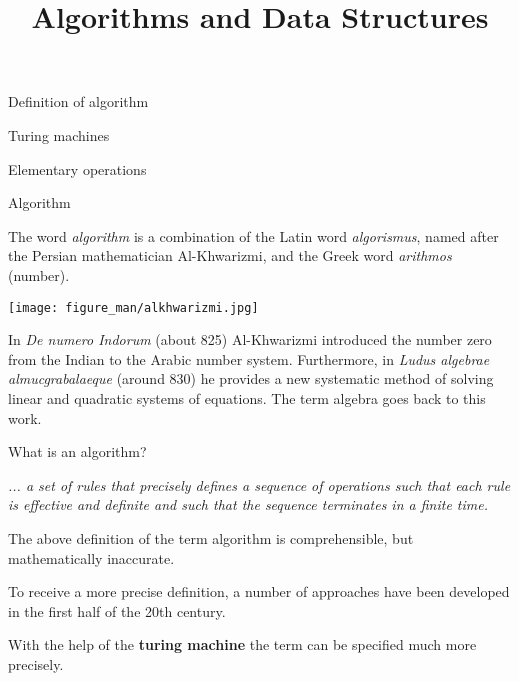 \documentclass[11pt,compress,t,notes=noshow, xcolor=table]{beamer}
\title{Algorithms and Data Structures}
\begin{document}
{
  \item Definition of algorithm
  \item Turing machines
  \item Elementary operations
}


\begin{vbframe}{Algorithm}

The word \emph{algorithm} is a combination of the Latin word \emph{algorismus}, named after the Persian mathematician Al-Khwarizmi, and the Greek word \emph{arithmos} (number).

\lz

\begin{minipage}{0.4\textwidth}
  \begin{center}
\texttt{[image: figure\_man/alkhwarizmi.jpg]}
  \end{center}
\end{minipage}
\begin{minipage}{0.5\textwidth}
  \begin{footnotesize}
  In \emph{De numero Indorum} (about 825) Al-Khwarizmi introduced the number zero from the Indian to the Arabic number system. Furthermore, in \emph{Ludus algebrae almucgrabalaeque} (around 830) he provides a new systematic method of solving linear and quadratic systems of equations. The term algebra goes back to this work.
  \end{footnotesize}
\end{minipage}



\framebreak

What is an algorithm?

\lz

\emph{... a set of rules that precisely defines a sequence of operations such that each rule is effective and definite and such that the sequence terminates in a finite time.} \\

\lz




The above definition of the term algorithm is comprehensible, but mathematically inaccurate.

\lz

To receive a more precise definition, a number of approaches have been developed in the first half of the 20th century.

\lz

With the help of the \textbf{turing machine} the term can be specified much more precisely.

\end{vbframe}
\end{document}
